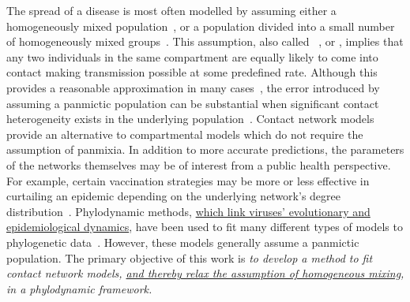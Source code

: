 \label{sec:obj}

The spread of a disease is most often modelled by assuming either a
homogeneously mixed population~\autocite{hamer1906milroy,
kermack1927contribution}, or a population divided into a small number of
homogeneously mixed groups~\autocite{rushton1955deterministic}. This
assumption, also called ~\autocite{heesterbeek2000mathematical}, or , implies
that any two individuals in the same compartment are equally likely to come
into contact making transmission possible at some predefined rate. Although
this provides a reasonable approximation in many
cases~\autocite{anderson1992infectious}, the error introduced by assuming a
panmictic population can be substantial when significant contact heterogeneity
exists in the underlying
population~\autocite{bansal2007individual,barthelemy2005dynamical,keeling2005networks}.
Contact network models provide an alternative to compartmental models which do
not require the assumption of panmixia. In addition to more accurate
predictions, the parameters of the networks themselves may be of interest from
a public health perspective. For example, certain vaccination strategies may be
more or less effective in curtailing an epidemic depending on the underlying
network's degree distribution~\autocite{peng2013vaccination, ma2013importance}.
Phylodynamic methods, {\color{blue}\uline{which link viruses' evolutionary and
epidemiological dynamics}}, have been used to fit many different types of models
to phylogenetic data~\autocite{pybus2009evolutionary,volz2013viral}. However,
these models generally assume a panmictic population. The primary objective of
this work is \emph{to develop a method to fit contact network models,
{\color{blue}\uline{and thereby relax the assumption of homogeneous mixing}},
in a phylodynamic framework.}

\newcommand{\G}{\mathcal{G}}
\newcommand{\Nu}{\mathcal{N}}

